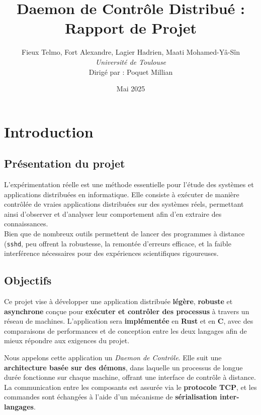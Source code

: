 \documentclass{article}
\title{Daemon de Contrôle Distribué : Rapport de Projet}
\author{
    Fieux Telmo, Fort Alexandre, Lagier Hadrien, Maati Mohamed-Yâ-Sîn \\
    \textit{Université de Toulouse} \\
    Dirigé par : Poquet Millian
}
\date{Mai 2025}
\begin{document}
\pagestyle{fancy}
\fancyhf{} %
\fancyhead[R]{\thepage} %

\maketitle
\newpage
\tableofcontents %
\newpage

\section{Introduction}

\subsection{Présentation du projet}

L’expérimentation réelle est une méthode essentielle pour l’étude des systèmes et applications distribuées en informatique. Elle consiste à exécuter de manière contrôlée de vraies
applications distribuées sur des systèmes réels, permettant ainsi d’observer et d’analyser leur
comportement afin d’en extraire des connaissances.\\

Bien que de nombreux outils permettent de lancer des programmes à distance (\texttt{sshd}, peu offrent la
robustesse, la remontée d’erreurs efficace, et la faible interférence nécessaires pour des expériences scientifiques rigoureuses.

\subsection{Objectifs}

Ce projet vise à développer une application distribuée \textbf{légère}, \textbf{robuste} et \textbf{asynchrone} conçue pour \textbf{exécuter et contrôler des processus} à travers un réseau de machines. L'application sera \textbf{implémentée} en \textbf{Rust} et en \textbf{C}, avec des comparaisons de performances et de conception entre les deux langages afin de mieux répondre aux exigences du projet.\newline

Nous appelons cette application un \textit{Daemon de Contrôle}. Elle suit une \textbf{architecture basée sur des démons}, dans laquelle un processus de longue durée fonctionne sur chaque machine, offrant une interface de contrôle à distance. La communication entre les composants est assurée via le \textbf{protocole TCP}, et les commandes sont échangées à l'aide d'un mécanisme de \textbf{sérialisation inter-langages}.\\
\end{document}
